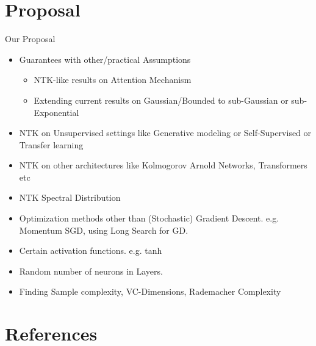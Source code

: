 \documentclass[serif, aspectratio=169]{beamer}
\begin{document}
\section{Proposal}


\begin{frame}{Our Proposal}
\begin{itemize}
	\item Guarantees with other/practical Assumptions
	\begin{itemize}
		\item NTK-like results on Attention Mechanism
		\item Extending current results on Gaussian/Bounded to sub-Gaussian or sub-Exponential
	\end{itemize}
	\item NTK on Unsupervised settings like Generative modeling or Self-Supervised or Transfer learning
	
	\item NTK on other architectures like Kolmogorov Arnold Networks, Transformers etc

\item  NTK Spectral Distribution
\item Optimization methods other than (Stochastic) Gradient Descent. e.g. Momentum SGD, using Long Search for GD.
\item Certain activation functions. e.g. tanh
\item Random number of neurons in Layers.
\item Finding Sample complexity, VC-Dimensions, Rademacher Complexity
\end{itemize}
\end{frame}


\section{References}

%    


\begin{frame}[allowframebreaks]
   \nocite{*} %
\end{frame}
\end{document}
